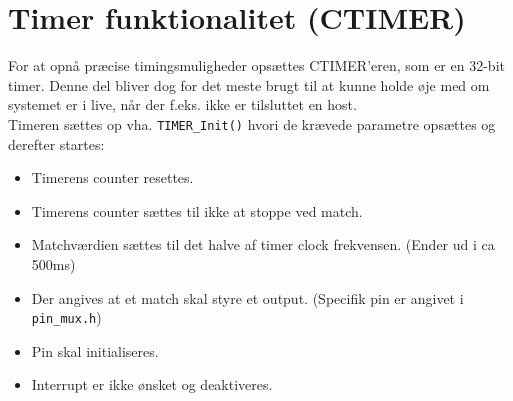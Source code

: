 \section{Timer funktionalitet (CTIMER)}
For at opnå præcise timingsmuligheder opsættes CTIMER'eren, som er en 32-bit timer. Denne del bliver dog for det meste brugt til at kunne holde øje med om systemet er i live, når der f.eks. ikke er tilsluttet en host. \\

Timeren sættes op vha. \verb|TIMER_Init()| hvori de krævede parametre opsættes og derefter startes: 

\begin{itemize}[noitemsep]
	\item Timerens counter resettes. 
	\item Timerens counter sættes til ikke at stoppe ved match.
	\item Matchværdien sættes til det halve af timer clock frekvensen. (Ender ud i ca 500ms)
	\item Der angives at et match skal styre et output. (Specifik pin er angivet i \verb|pin_mux.h|)
	\item Pin skal initialiseres. 
	\item Interrupt er ikke ønsket og deaktiveres.
\end{itemize}